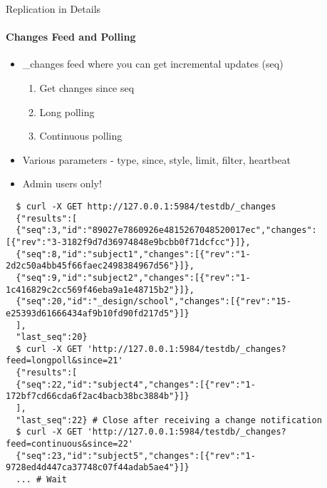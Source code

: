\documentclass{beamer}
\begin{document}
\begin{frame}[fragile]{Replication in Details}
  \framesubtitle{Changes Feed and Polling}
  \begin{itemize}
    \item \_changes feed where you can get incremental updates (seq)
    \begin{enumerate}
      \item Get changes since seq
      \item Long polling
      \item Continuous polling
    \end{enumerate}
    \item Various parameters - type, since, style, limit, filter, heartbeat
    \item Admin users only!
  \end{itemize}
  \fontsize{6}{8}\selectfont
  \begin{verbatim}
  $ curl -X GET http://127.0.0.1:5984/testdb/_changes
  {"results":[
  {"seq":3,"id":"89027e7860926e4815267048520017ec","changes":[{"rev":"3-3182f9d7d36974848e9bcbb0f71dcfcc"}]},
  {"seq":8,"id":"subject1","changes":[{"rev":"1-2d2c50a4bb45f66faec2498384967d56"}]},
  {"seq":9,"id":"subject2","changes":[{"rev":"1-1c416829c2cc569f46eba9a1e48715b2"}]},
  {"seq":20,"id":"_design/school","changes":[{"rev":"15-e25393d61666434af9b10fd90fd217d5"}]}
  ],
  "last_seq":20}
  $ curl -X GET 'http://127.0.0.1:5984/testdb/_changes?feed=longpoll&since=21'
  {"results":[
  {"seq":22,"id":"subject4","changes":[{"rev":"1-172bf7cd66cda6f2ac4bacb38bc3884b"}]}
  ],
  "last_seq":22} # Close after receiving a change notification
  $ curl -X GET 'http://127.0.0.1:5984/testdb/_changes?feed=continuous&since=22'
  {"seq":23,"id":"subject5","changes":[{"rev":"1-9728ed4d447ca37748c07f44adab5ae4"}]}
  ... # Wait
  \end{verbatim}
\end{frame}
\end{document}
